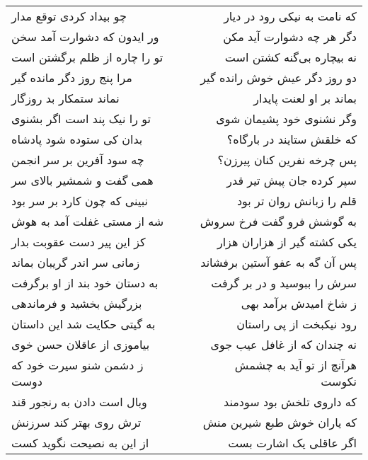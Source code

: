 \begin{center}
\begin{longtable}{l p{0.5cm} r}
چو بیداد کردی توقع مدار
&&
که نامت به نیکی رود در دیار
\\
ور ایدون که دشوارت آمد سخن
&&
دگر هر چه دشوارت آید مکن
\\
تو را چاره از ظلم برگشتن است
&&
نه بیچاره بی‌گنه کشتن است
\\
مرا پنج روز دگر مانده گیر
&&
دو روز دگر عیش خوش رانده گیر
\\
نماند ستمکار بد روزگار
&&
بماند بر او لعنت پایدار
\\
تو را نیک پند است اگر بشنوی
&&
وگر نشنوی خود پشیمان شوی
\\
بدان کی ستوده شود پادشاه
&&
که خلقش ستایند در بارگاه؟
\\
چه سود آفرین بر سر انجمن
&&
پس چرخه نفرین کنان پیرزن؟
\\
همی گفت و شمشیر بالای سر
&&
سپر کرده جان پیش تیر قدر
\\
نبینی که چون کارد بر سر بود
&&
قلم را زبانش روان تر بود
\\
شه از مستی غفلت آمد به هوش
&&
به گوشش فرو گفت فرخ سروش
\\
کز این پیر دست عقوبت بدار
&&
یکی کشته گیر از هزاران هزار
\\
زمانی سر اندر گریبان بماند
&&
پس آن گه به عفو آستین برفشاند
\\
به دستان خود بند از او برگرفت
&&
سرش را ببوسید و در بر گرفت
\\
بزرگیش بخشید و فرماندهی
&&
ز شاخ امیدش برآمد بهی
\\
به گیتی حکایت شد این داستان
&&
رود نیکبخت از پی راستان
\\
بیاموزی از عاقلان حسن خوی
&&
نه چندان که از غافل عیب جوی
\\
ز دشمن شنو سیرت خود که دوست
&&
هرآنچ از تو آید به چشمش نکوست
\\
وبال است دادن به رنجور قند
&&
که داروی تلخش بود سودمند
\\
ترش روی بهتر کند سرزنش
&&
که یاران خوش طبع شیرین منش
\\
از این به نصیحت نگوید کست
&&
اگر عاقلی یک اشارت بست
\\
\end{longtable}
\end{center}
